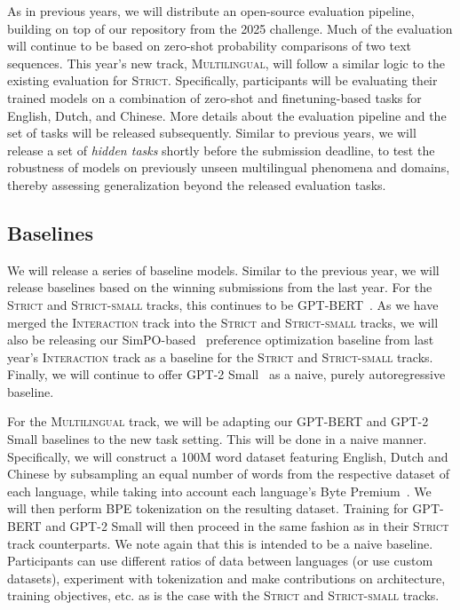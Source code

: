 \documentclass[11pt]{article}
\newcommand{\strict}[1]{\textsc{Strict}}
\newcommand{\strictsmall}[1]{\textsc{Strict-small}}
\newcommand{\interact}[1]{\textsc{Interaction}}
\newcommand{\multilingual}[1]{\textsc{Multilingual}}
\begin{document}
As in previous years, we will distribute an open-source evaluation pipeline, building on top of our repository from the 2025 challenge. Much of the evaluation will continue to be based on zero-shot probability comparisons of two text sequences. This year's new track, \multilingual{}, will follow a similar logic to the existing evaluation for \strict{}. Specifically, participants will be evaluating their trained models on a combination of zero-shot and finetuning-based tasks for English, Dutch, and Chinese. More details about the evaluation pipeline and the set of tasks will be released subsequently. %
Similar to previous years, we will release a set of \textit{hidden tasks} shortly before the submission deadline, to test the robustness of models on previously unseen multilingual phenomena and domains, thereby assessing generalization beyond the released evaluation tasks.

\subsection{Baselines}
We will release a series of baseline models.
Similar to the previous year, we will release baselines based on the winning submissions from the last year. For the \strict{} and \strictsmall{} tracks, this continues to be GPT-BERT~\citep{charpentier2024gptbertboth}. As we have merged the \interact{} track into the \strict{} and \strictsmall{} tracks, we will also be releasing our SimPO-based~\citep{meng2024simpo} preference optimization baseline from last year's \interact{} track as a baseline for the \strict{} and \strictsmall{} tracks. Finally, we will continue to offer GPT-2 Small~\citep{radford2019language} as a naive, purely autoregressive baseline.

For the \multilingual{} track, we will be adapting our GPT-BERT and GPT-2 Small baselines to the new task setting. This will be done in a naive manner. Specifically, we will construct a 100M word dataset featuring English, Dutch and Chinese by subsampling an equal number of words from the respective dataset of each language, while taking into account each language's Byte Premium~\citep{arnett-etal-2024-bit}. We will then perform BPE tokenization on the resulting dataset. Training for GPT-BERT and GPT-2 Small will then proceed in the same fashion as in their \strict{} track counterparts. We note again that this is intended to be a naive baseline. Participants can use different ratios of data between languages (or use custom datasets), experiment with tokenization and make contributions on architecture, training objectives, etc. as is the case with the \strict{} and \strictsmall{} tracks.
\end{document}
